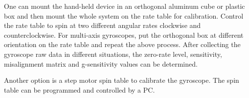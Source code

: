 One can mount the hand-held device in an orthogonal aluminum cube or plastic box and then mount the whole system on the rate table for calibration. Control the rate table to spin at two different angular rates clockwise and counterclockwise. For multi-axis gyroscopes, put the orthogonal box at different orientation on the rate table and repeat the above process. After collecting the gyroscope raw data in different situations, the zero-rate level, sensitivity, misalignment matrix and g-sensitivity values can be determined.

Another option is a step motor spin table to calibrate the gyroscope. The spin table can be programmed and controlled by a PC. 

